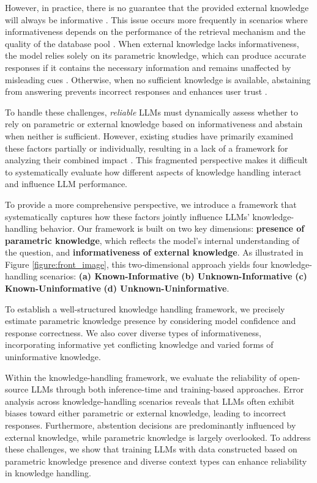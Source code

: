 However, in practice, there is no guarantee that the provided external knowledge will always be informative \citep{asai2024selfrag}.
This issue occurs more frequently in scenarios where informativeness depends on the performance of the retrieval mechanism and the quality of the database pool \citep{izacard2022unsupervised, pmlr-v119-guu20a}.
When external knowledge lacks informativeness, the model relies solely on its parametric knowledge, which can produce accurate responses if it contains the necessary information and remains unaffected by misleading cues \citep{yoran2023making, kim-etal-2024-adaptive, park2024enhancing}.
Otherwise, when no sufficient knowledge is available, abstaining from answering prevents incorrect responses and enhances user trust \citep{wen2024know, wen-etal-2024-characterizing, zhou-etal-2023-context, zhang-etal-2024-r}.


To handle these challenges, \textit{reliable} LLMs must dynamically assess whether to rely on parametric or external knowledge based on informativeness and abstain when neither is sufficient.
However, existing studies have primarily examined these factors partially or individually, resulting in a lack of a framework for analyzing their combined impact \citep{su2024textttconflictbank, li-etal-2023-large}.
This fragmented perspective makes it difficult to systematically evaluate how different aspects of knowledge handling interact and influence LLM performance.


To provide a more comprehensive perspective, we introduce a framework that systematically captures how these factors jointly influence LLMs' knowledge-handling behavior.
Our framework is built on two key dimensions: \textbf{presence of parametric knowledge}, which reflects the model's internal understanding of the question, and \textbf{informativeness of external knowledge}.
As illustrated in Figure \ref{figure:front_image}, this two-dimensional approach yields four knowledge-handling scenarios: \textbf{(a) Known-Informative} \textbf{(b) Unknown-Informative} \textbf{(c) Known-Uninformative} \textbf{(d) Unknown-Uninformative}.


To establish a well-structured knowledge handling framework, we precisely estimate parametric knowledge presence by considering model confidence \citep{kuhn2023semantic, 10820047} and response correctness. 
We also cover diverse types of informativeness, incorporating informative yet conflicting knowledge and varied forms of uninformative knowledge.


Within the knowledge-handling framework, we evaluate the reliability of open-source LLMs through both inference-time and training-based approaches.
Error analysis across knowledge-handling scenarios reveals that LLMs often exhibit biases toward either parametric or external knowledge, leading to incorrect responses.
Furthermore, abstention decisions are predominantly influenced by external knowledge, while parametric knowledge is largely overlooked.
To address these challenges, we show that training LLMs with data constructed based on parametric knowledge presence and diverse context types can enhance reliability in knowledge handling.

